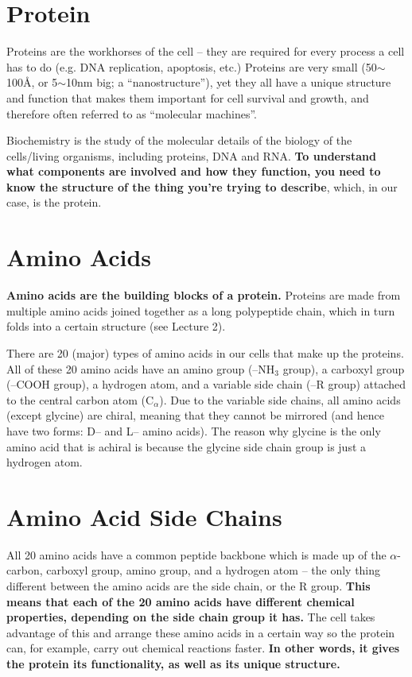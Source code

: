 \section{Protein}

Proteins are the workhorses of the cell -- they are required for every process a cell has to do (e.g. DNA replication, apoptosis, etc.)
Proteins are very small (50$\sim$100\AA{}, or 5$\sim$10nm big; a ``nanostructure''), yet they all have a unique structure and function that makes them important for cell survival and growth, and therefore often referred to as ``molecular machines''.

Biochemistry is the study of the molecular details of the biology of the cells/living organisms, including proteins, DNA and RNA.
\textbf{To understand what components are involved and how they function, you need to know the structure of the thing you're trying to describe}, which, in our case, is the protein.

\section{Amino Acids}

\textbf{Amino acids are the building blocks of a protein.}
Proteins are made from multiple amino acids joined together as a long polypeptide chain, which in turn folds into a certain structure (see Lecture 2).

There are 20 (major) types of amino acids in our cells that make up the proteins.
All of these 20 amino acids have an amino group (--NH$_3$ group), a carboxyl group (--COOH group), a hydrogen atom, and a variable side chain (--R group) attached to the central carbon atom (C$_{\alpha}$).
Due to the variable side chains, all amino acids (except glycine) are chiral, meaning that they cannot be mirrored (and hence have two forms: D-- and L-- amino acids).
The reason why glycine is the only amino acid that is achiral is because the glycine side chain group is just a hydrogen atom.


\section{Amino Acid Side Chains}

All 20 amino acids have a common peptide backbone which is made up of the $\alpha$-carbon, carboxyl group, amino group, and a hydrogen atom -- the only thing different between the amino acids are the side chain, or the R group.
\textbf{This means that each of the 20 amino acids have different chemical properties, depending on the side chain group it has.}
The cell takes advantage of this and arrange these amino acids in a certain way so the protein can, for example, carry out chemical reactions faster.
\textbf{In other words, it gives the protein its functionality, as well as its unique structure.}

